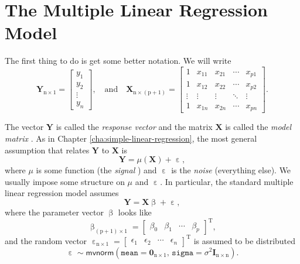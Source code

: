 \documentclass[captions=tableheading]{scrbook}
\begin{document}
\section{The Multiple Linear Regression Model}
\label{sec-1-1}

\label{sec:The-MLR-Model}

The first thing to do is get some better notation. We will write 
\begin{equation}
\mathbf{Y}_{\mathrm{n}\times1}=
\begin{bmatrix}y_{1}\\
y_{2}\\
\vdots\\
y_{n}
\end{bmatrix},
\quad\mbox{and}\quad\mathbf{X}_{\mathrm{n}\times(\mathrm{p}+1)}=
\begin{bmatrix}1 & x_{11} & x_{21} & \cdots & x_{p1}\\
1 & x_{12} & x_{22} & \cdots & x_{p2}\\
\vdots & \vdots & \vdots & \ddots & \vdots\\
1 & x_{1n} & x_{2n} & \cdots & x_{pn}
\end{bmatrix}.
\end{equation}

The vector $\mathbf{Y}$ is called the \emph{response vector}  and the matrix $\mathbf{X}$ is called the \emph{model matrix} . As in Chapter \ref{cha:simple-linear-regression}, the most general assumption that relates $\mathbf{Y}$ to $\mathbf{X}$ is
\begin{equation}
\mathbf{Y}=\mu(\mathbf{X})+\upepsilon,
\end{equation}
where $\mu$ is some function (the \emph{signal} ) and $\upepsilon$ is the \emph{noise} (everything else). We usually impose some structure on $\mu$ and $\upepsilon$. In particular, the standard multiple linear regression model assumes
\begin{equation}
\mathbf{Y}=\mathbf{X}\upbeta+\upepsilon,
\end{equation}
where the parameter vector $\upbeta$ looks like 
\begin{equation}
\upbeta_{(\mathrm{p}+1)\times1}=\begin{bmatrix}\beta_{0} & \beta_{1} & \cdots & \beta_{p}\end{bmatrix}^{\mathrm{T}},
\end{equation}
and the random vector $\upepsilon_{\mathrm{n}\times1}=\begin{bmatrix}\epsilon_{1} & \epsilon_{2} & \cdots & \epsilon_{n}\end{bmatrix}^{\mathrm{T}}$ is assumed to be distributed
\begin{equation}
\upepsilon\sim\mathsf{mvnorm}\left(\mathtt{mean}=\mathbf{0}_{\mathrm{n}\times1},\,\mathtt{sigma}=\sigma^{2}\mathbf{I}_{\mathrm{n}\times\mathrm{n}}\right).
\end{equation}
\end{document}
